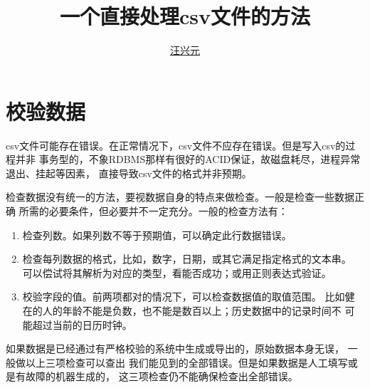 \documentclass[12pt]{article}
\begin{document}
\title{一个直接处理csv文件的方法}
\author{\href{mailto:xtwxy@hotmail.com}{汪兴元}}
\maketitle
{}

\tableofcontents

\section{校验数据}
csv文件可能存在错误。在正常情况下，csv文件不应存在错误。但是写入csv的过程并非
事务型的，不象RDBMS那样有很好的ACID保证，故磁盘耗尽，进程异常退出、挂起等因素，
直接导致csv文件的格式并非预期。

检查数据没有统一的方法，要视数据自身的特点来做检查。一般是检查一些数据正确
所需的必要条件，但必要并不一定充分。一般的检查方法有：
\begin{enumerate}
  \item 检查列数。如果列数不等于预期值，可以确定此行数据错误。
  \item 检查每列数据的格式，比如，数字，日期，或其它满足指定格式的文本串。
    可以偿试将其解析为对应的类型，看能否成功；或用正则表达式验证。
  \item 校验字段的值。前两项都对的情况下，可以检查数据值的取值范围。
    比如健在的人的年龄不能是负数，也不能是数百以上；历史数据中的记录时间不
    可能超过当前的日历时钟。 
\end{enumerate}

如果数据是已经通过有严格校验的系统中生成或导出的，原始数据本身无误，
一般做以上三项检查可以查出
我们能见到的全部错误。但是如果数据是人工填写或是有故障的机器生成的，
这三项检查仍不能确保检查出全部错误。
\end{document}
